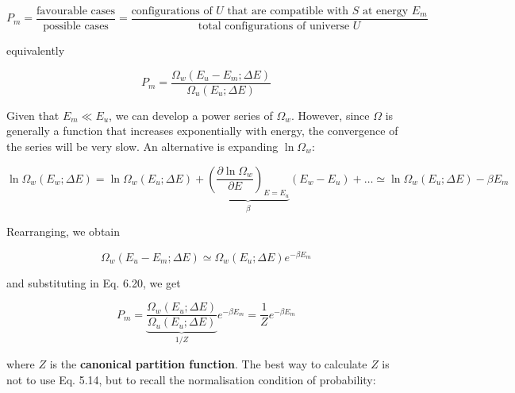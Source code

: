 \documentclass[12pt,a4paper]{report}
\newcommand{\esp}{\vspace{0.5cm}}
\begin{document}
\esp

\begin{equation}
	P_m = \frac{\text{favourable cases}}{\text{possible cases}} = \frac{\text{configurations of } U \text{ that are compatible with } S \text{ at energy } E_m}{\text{total configurations of universe } U} \tag{5.10}
\end{equation}

\esp

equivalently

\esp

\begin{equation}
	P_m = \frac{\Omega_w(E_u - E_m; \Delta E)}{\Omega_u(E_u; \Delta E)} \tag{5.11}
\end{equation}

\esp

Given that $E_m \ll E_u$, we can develop a power series of $\Omega_w$. However, since $\Omega$ is generally a function that increases exponentially with energy, the convergence of the series will be very slow. An alternative is expanding $\ln \Omega_w$:

\esp

\begin{equation}
	\ln \Omega_w(E_w; \Delta E) = \ln \Omega_w(E_u; \Delta E) + \underbrace{\left( \frac{\partial \ln \Omega_w}{\partial E} \right)_{E=E_u}}_{\beta} (E_w - E_u) + \dots \simeq \ln \Omega_w(E_u; \Delta E) - \beta E_m \tag{5.12}
\end{equation}

\esp

Rearranging, we obtain

\esp

\begin{equation}
	\Omega_w(E_u - E_m; \Delta E) \simeq \Omega_w(E_u; \Delta E) e^{-\beta E_m} \tag{5.13}
\end{equation}

\esp

and substituting in Eq. 6.20, we get

\esp

\begin{equation}
	P_m = \underbrace{\frac{\Omega_w(E_u; \Delta E)}{\Omega_u(E_u; \Delta E)}}_{1/Z} e^{-\beta E_m} = \frac{1}{Z} e^{-\beta E_m} \tag{5.14}
\end{equation}

\esp

where $Z$ is the \textbf{canonical partition function}. The best way to calculate $Z$ is not to use Eq. 5.14, but to recall the normalisation condition of probability:
\end{document}
